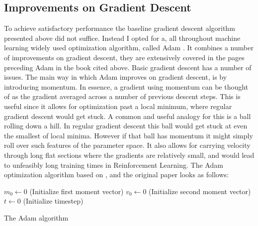 \subsection{Improvements on Gradient Descent}\label{subsec:gd:adam}
To achieve satisfactory performance the baseline gradient descent algorithm presented above did not suffice. Instead I opted for a, all throughout machine learning widely used optimization algorithm, called Adam \cite[pg 305]{Goodfellow-et-al-2016}. It combines a number of improvements on gradient descent, they are extensively covered in the pages preceding Adam in the book cited above. Basic gradient descent has a number of issues. The main way in which Adam improves on gradient descent, is by introducing momentum. In essence, a gradient using momentum can be thought of as the gradient averaged across a number of previous descent steps. This is useful since it allows for optimization past a local minimum, where regular gradient descent would get stuck. A common and useful analogy for this is a ball rolling down a hill. In regular gradient descent this ball would get stuck at even the smallest of local minima. However if that ball has momentum it might simply roll over such features of the parameter space. It also allows for carrying velocity through long flat sections where the gradients are relatively small, and would lead to unfeasibly long training times in Reinforcement Learning. The Adam optimization algorithm based on \cite[p. 306]{Goodfellow-et-al-2016}, and the original paper \cite{kingma2017adam} looks as follows:

\begin{algorithm}[H]
\DontPrintSemicolon
\SetAlgoLined
 \KwRequire{$\rho_1, \rho_2 \in \left[0, 1\right)$ Exponential decay rates for momentum estimates}
 $m_0 \leftarrow 0$ (Initialize first moment vector)\;
 $v_0 \leftarrow 0$ (Initialize second moment vector)\;
 $t \leftarrow 0$ (Initialize timestep)\;
 \caption{The Adam algorithm}
\end{algorithm}
